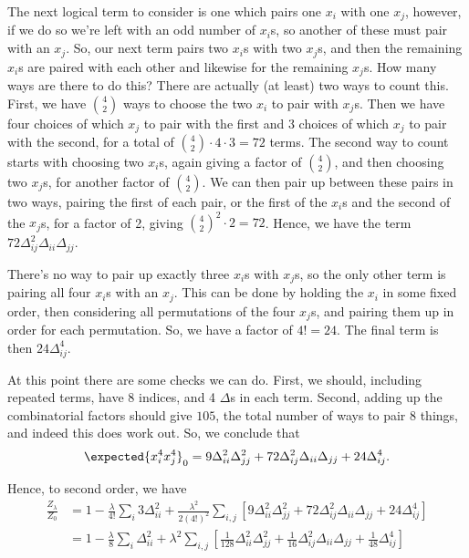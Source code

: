 \documentclass[fleqn]{NotesClass}
\begin{document}
    The next logical term to consider is one which pairs one \(x_i\) with one \(x_j\), however, if we do so we're left with an odd number of \(x_i\)s, so another of these must pair with an \(x_j\).
    So, our next term pairs two \(x_i\)s with two \(x_j\)s, and then the remaining \(x_i\)s are paired with each other and likewise for the remaining \(x_j\)s.
    How many ways are there to do this?
    There are actually (at least) two ways to count this.
    First, we have \(\binom{4}{2}\) ways to choose the two \(x_i\) to pair with \(x_j\)s.
    Then we have four choices of which \(x_j\) to pair with the first and 3 choices of which \(x_j\) to pair with the second, for a total of \(\binom{4}{2} \cdot 4 \cdot 3 = 72\) terms.
    The second way to count starts with choosing two \(x_i\)s, again giving a factor of \(\binom{4}{2}\), and then choosing two \(x_j\)s, for another factor of \(\binom{4}{2}\).
    We can then pair up between these pairs in two ways, pairing the first of each pair, or the first of the \(x_i\)s and the second of the \(x_j\)s, for a factor of 2, giving \(\binom{4}{2}^2 \cdot 2 = 72\).
    Hence, we have the term \(72\Delta_{ij}^2\Delta_{ii}\Delta_{jj}\).
    
    There's no way to pair up exactly three \(x_i\)s with \(x_j\)s, so the only other term is pairing all four \(x_i\)s with an \(x_j\).
    This can be done by holding the \(x_i\) in some fixed order, then considering all permutations of the four \(x_j\)s, and pairing them up in order for each permutation.
    So, we have a factor of \(4! = 24\).
    The final term is then \(24\Delta_{ij}^4\).
    
    At this point there are some checks we can do.
    First, we should, including repeated terms, have 8 indices, and 4 \(\Delta\)s in each term.
    Second, adding up the combinatorial factors should give \(105\), the total number of ways to pair 8 things, and indeed this does work out.
    So, we conclude that
    \begin{equation}
        \expected{x_i^4 x_j^4}_0 = 9\Delta_{ii}^2\Delta_{jj}^2 + 72\Delta_{ij}^2\Delta_{ii}\Delta_{jj} + 24\Delta_{ij}^4.
    \end{equation}
    
    Hence, to second order, we have
    \begin{align}
        \frac{Z_\lambda}{Z_0} &= 1 - \frac{\lambda}{4!} \sum_{i} 3\Delta_{ii}^2 + \frac{\lambda^2}{2 (4!)^2}\sum_{i,j}[9\Delta_{ii}^2\Delta_{jj}^2 + 72\Delta_{ij}^2\Delta_{ii}\Delta_{jj} + 24\Delta_{ij}^4]\\
        &= 1 - \frac{\lambda}{8} \sum_i \Delta_{ii}^2 + \lambda^2\sum_{i,j} \left[ \frac{1}{128}\Delta_{ii}^2\Delta_{jj}^2 + \frac{1}{16}\Delta_{ij}^2\Delta_{ii}\Delta_{jj} + \frac{1}{48}\Delta_{ij}^4 \right]
    \end{align}
    
\end{document}
